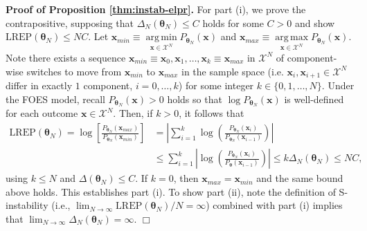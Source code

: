 \documentclass[]{article}
\theoremstyle{definition}
\DeclareMathOperator*{\argmin}{arg\,min}
\DeclareMathOperator*{\argmax}{arg\,max}
\newcommand{\REP}{\mathrm{LREP}}
\newcommand{\DN}{\Delta_N}
\begin{document}
\textbf{Proof of Proposition \ref{thm:instab-elpr}.} For part (i), we
prove the contrapositive, supposing that
\(\DN(\boldsymbol \theta_N) \le C\) holds for some \(C > 0\) and show
\(\REP(\boldsymbol \theta_N) \leq NC\). Let
\(\boldsymbol x_{min} \equiv \argmin\limits_{\boldsymbol x \in \mathcal{X}^N}P_{\boldsymbol \theta_N}(\boldsymbol x)\)
and
\(\boldsymbol x_{max} \equiv \argmax\limits_{\boldsymbol x \in \mathcal{X}^N}P_{\boldsymbol \theta_N}(\boldsymbol x)\).
Note there exists a sequence
\(\boldsymbol x_{min} \equiv \boldsymbol x_0, \boldsymbol x_1, \dots, \boldsymbol x_k \equiv \boldsymbol x_{max}\)
in \(\mathcal{X}^N\) of component-wise switches to move from
\(\boldsymbol x_{min}\) to \(\boldsymbol x_{max}\) in the sample space
(i.e. \(\boldsymbol x_i, \boldsymbol x_{i + 1} \in \mathcal{X}^N\)
differ in exactly \(1\) component, \(i = 0, \dots, k\)) for some integer
\(k \in \{0, 1, \dots, N\}\). Under the FOES model, recall
\(P_{\boldsymbol \theta_N}(\boldsymbol x) > 0\) holds so that
\(\log P_{\boldsymbol \theta_N}(\boldsymbol x)\) is well-defined for
each outcome \(\boldsymbol x \in \mathcal{X}^N\). Then, if \(k > 0\), it
follows that
\begin{align*}
\REP(\boldsymbol \theta_N) = \log\left[\frac{P_{\boldsymbol \theta_N}(\boldsymbol x_{max})}{P_{\boldsymbol \theta_N}(\boldsymbol x_{min})}\right] &= \left|\sum\limits_{i = 1}^k\log\left(\frac{P_{\boldsymbol \theta_N}(\boldsymbol x_i)}{P_{\boldsymbol \theta_N}(\boldsymbol x_{i-1})}\right)\right| \\
&\le \sum\limits_{i = 1}^k\left|\log\left(\frac{P_{\boldsymbol \theta_N}(\boldsymbol x_i)}{P_{\boldsymbol \theta}(\boldsymbol x_{i-1})}\right)\right| \le k \Delta_N(\boldsymbol \theta_N) \le NC,
\end{align*}
using \(k \le N\) and \(\Delta(\boldsymbol \theta_N) \le C\). If
\(k = 0\), then \(\boldsymbol x_{max} = \boldsymbol x_{min}\) and the
same bound above holds. This establishes part (i). To show part (ii),
note the definition of S-instability (i.e.,
\(\lim_{N\to \infty}\REP(\boldsymbol \theta_N)/N= \infty\)) combined
with part (i) implies that
\(\lim_{N\to \infty}\DN(\boldsymbol \theta_N)=\infty\). \hfill \(\Box\)
\end{document}
